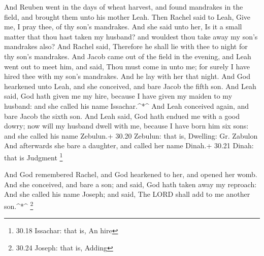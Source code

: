  And Reuben went in the days of wheat harvest, and found
mandrakes in the field, and brought them unto his mother Leah. Then
Rachel said to Leah, Give me, I pray thee, of thy son's mandrakes.
 And she said unto her, Is it a small matter that thou hast
taken my husband? and wouldest thou take away my son's mandrakes also?
And Rachel said, Therefore he shall lie with thee to night for thy son's
mandrakes.  And Jacob came out of the field in the evening,
and Leah went out to meet him, and said, Thou must come in unto me; for
surely I have hired thee with my son's mandrakes. And he lay with her
that night.  And God hearkened unto Leah, and she
conceived, and bare Jacob the fifth son.  And Leah said,
God hath given me my hire, because I have given my maiden to my husband:
and she called his name Issachar.\^{}*\^{}  And Leah
conceived again, and bare Jacob the sixth son.  And Leah
said, God hath endued me with a good dowry; now will my husband dwell
with me, because I have born him six sons: and she called his name
Zebulun.+ 30.20 Zebulun: that is, Dwelling: Gr. Zabulon 
And afterwards she bare a daughter, and called her name Dinah.+ 30.21
Dinah: that is Judgment \footnote{30.18 Issachar: that is, An hire}

 And God remembered Rachel, and God hearkened to her, and
opened her womb.  And she conceived, and bare a son; and
said, God hath taken away my reproach:  And she called his
name Joseph; and said, The LORD shall add to me another son.\^{}*\^{}
\footnote{30.24 Joseph: that is, Adding}

